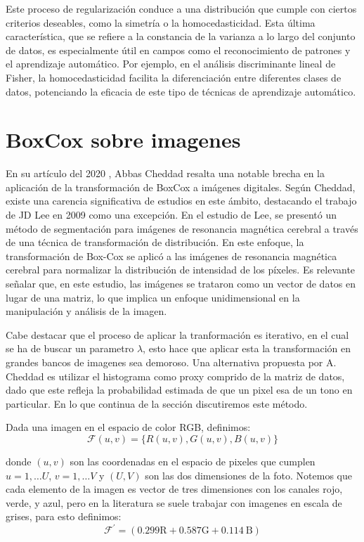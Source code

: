     Este proceso de regularizaci\'on conduce a una distribuci\'on que cumple con ciertos criterios deseables, como la simetr\'ia o la homocedasticidad. Esta \'ultima caracter\'istica, que se refiere a la constancia de la varianza a lo largo del conjunto de datos, es especialmente \'util en campos como el reconocimiento de patrones y el aprendizaje autom\'atico. Por ejemplo, en el an\'alisis discriminante lineal de Fisher, la homocedasticidad facilita la diferenciaci\'on entre diferentes clases de datos, potenciando la eficacia de este tipo de t\'ecnicas de aprendizaje autom\'atico.



    \section[]{BoxCox sobre imagenes} 

    En su art\'iculo del 2020 \cite{boxcoximg}, Abbas Cheddad resalta una notable brecha en la aplicaci\'on de la transformaci\'on de BoxCox a im\'agenes digitales. Seg\'un Cheddad, existe una carencia significativa de estudios en este \'ambito, destacando el trabajo de JD Lee en 2009 como una excepci\'on\cite{lee2009mr}. En el estudio de Lee, se present\'o un m\'etodo de segmentaci\'on para im\'agenes de resonancia magn\'etica cerebral a trav\'es de una t\'ecnica de transformaci\'on de distribuci\'on. En este enfoque, la transformaci\'on de Box-Cox se aplic\'o a las im\'agenes de resonancia magn\'etica cerebral para normalizar la distribuci\'on de intensidad de los p\'ixeles. Es relevante se\~nalar que, en este estudio, las im\'agenes se trataron como un vector de datos en lugar de una matriz, lo que implica un enfoque unidimensional en la manipulaci\'on y an\'alisis de la imagen.

    Cabe destacar que el proceso de aplicar la tranformaci\'on es iterativo, en el cual se ha de buscar un parametro $\lambda$, esto hace que aplicar esta la transformaci\'on en grandes bancos de imagenes sea demoroso. Una alternativa propuesta por A. Cheddad \cite{boxcoximg} es utilizar el histograma como proxy comprido de la matriz de datos, dado que este refleja la probabilidad estimada de que un pixel esa de un tono en particular. En lo que continua de la secci\'on discutiremos este m\'etodo.

    Dada una imagen en el espacio de color RGB, definimos:
    $$
    \mathcal{F}(u, v)=\{R(u, v), G(u, v), B(u, v)\}
    $$

    donde $(u, v)$ son las coordenadas en el espacio de pixeles que cumplen $u=1, \ldots U$, $v=1, \ldots V$ y $(U, V)$ son las dos dimensiones de la foto. Notemos que cada elemento de la imagen es vector de tres dimensiones con los canales rojo, verde, y azul, pero en la literatura se suele trabajar con imagenes en escala de grises, para esto definimos:
    $$
    \mathcal{F}^{\prime} =(0.299 \mathrm{R}+0.587 \mathrm{G}+0.114 \mathrm{~B})
    $$


